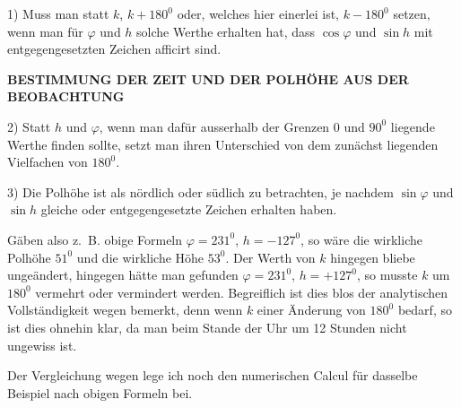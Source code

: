 1) Muss man statt $k$, $k+180^0$ oder, welches hier einerlei ist, $k-180^0$ setzen, wenn man für $\varphi$ und $h$ solche Werthe erhalten hat, dass $\cos\varphi$ und $\sin h$ mit entgegengesetzten Zeichen afficirt sind.
\par\clearpage
\endgroup
\clearpage
\begingroup
\pagestyle{empty}
\thispagestyle{empty}
\noindent{}%
%
\parbox[t]{\dimexpr\linewidth-20mm\relax}{\centering\fontsize{7.2}{9}\selectfont\bfseries BESTIMMUNG DER ZEIT UND DER POLHÖHE AUS DER BEOBACHTUNG\par}%
\makebox[10mm][r]{}\par\nobreak\medskip
\begingroup\fontsize{10.65}{12}\selectfont

2) Statt $h$ und $\varphi$, wenn man dafür ausserhalb der Grenzen $0$ und $90^0$ liegende Werthe finden sollte, setzt man ihren Unterschied von dem zunächst liegenden Vielfachen von $180^0$.

3) Die Polhöhe ist als nördlich oder südlich zu betrachten, je nachdem $\sin\varphi$ und $\sin h$ gleiche oder entgegengesetzte Zeichen erhalten haben.

Gäben also z.\ B. obige Formeln $\varphi=231^0$, $h=-127^0$, so wäre die wirkliche Polhöhe $51^0$ und die wirkliche Höhe $53^0$. Der Werth von $k$ hingegen bliebe ungeändert, hingegen hätte man gefunden $\varphi=231^0$, $h=+127^0$, so musste $k$ um $180^0$ vermehrt oder vermindert werden. Begreiflich ist dies blos der analytischen Vollständigkeit wegen bemerkt, denn wenn $k$ einer Änderung von $180^0$ bedarf, so ist dies ohnehin klar, da man beim Stande der Uhr um 12 Stunden nicht ungewiss ist.

Der Vergleichung wegen lege ich noch den numerischen Calcul für dasselbe Beispiel nach obigen Formeln bei.


